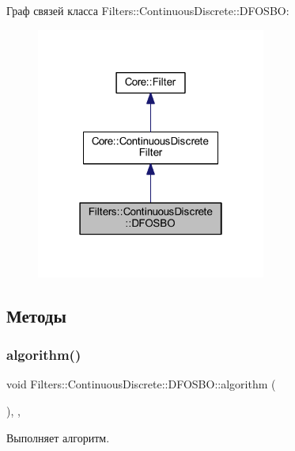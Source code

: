 Граф связей класса Filters\+:\+:Continuous\+Discrete\+:\+:D\+F\+O\+S\+BO\+:
\nopagebreak
\begin{figure}[H]
\begin{center}
\leavevmode
\includegraphics[width=214pt]{class_filters_1_1_continuous_discrete_1_1_d_f_o_s_b_o__coll__graph}
\end{center}
\end{figure}


\subsection{Методы}
\hypertarget{class_filters_1_1_continuous_discrete_1_1_d_f_o_s_b_o_ab911983ab9ff8e22dc68e33fdb4601b6}{}\label{class_filters_1_1_continuous_discrete_1_1_d_f_o_s_b_o_ab911983ab9ff8e22dc68e33fdb4601b6} 
\subsubsection{\texorpdfstring{algorithm()}{algorithm()}}
{\footnotesize\ttfamily void Filters\+::\+Continuous\+Discrete\+::\+D\+F\+O\+S\+B\+O\+::algorithm (\begin{DoxyParamCaption}{ }\end{DoxyParamCaption})\hspace{0.3cm}{\ttfamily [override]}, {\ttfamily [protected]}, {\ttfamily [virtual]}}



Выполняет алгоритм. 

